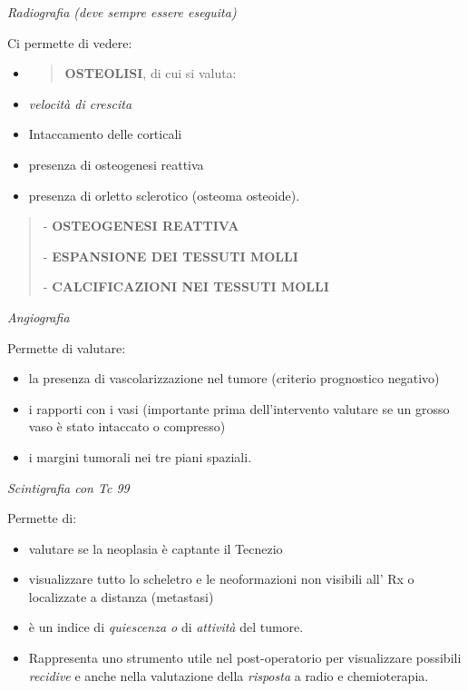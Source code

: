 \documentclass[]{article}
\begin{document}
\emph{Radiografia (deve sempre essere eseguita)}

Ci permette di vedere:

\begin{itemize}
\item
  \begin{quote}
  \textbf{OSTEOLISI}, di cui si valuta:
  \end{quote}
\end{itemize}

\begin{itemize}
\item
  \emph{velocità di crescita}
\item
  Intaccamento delle corticali
\item
  presenza di osteogenesi reattiva
\item
  presenza di orletto sclerotico (osteoma osteoide).
\end{itemize}

\begin{quote}
- \textbf{OSTEOGENESI REATTIVA}

- \textbf{ESPANSIONE DEI TESSUTI MOLLI}

- \textbf{CALCIFICAZIONI NEI TESSUTI MOLLI}
\end{quote}

\emph{Angiografia}

Permette di valutare:

\begin{itemize}
\item
  la presenza di vascolarizzazione nel tumore (criterio prognostico
  negativo)
\item
  i rapporti con i vasi (importante prima dell'intervento valutare se un
  grosso vaso è stato intaccato o compresso)
\item
  i margini tumorali nei tre piani spaziali.
\end{itemize}

\emph{Scintigrafia con Tc 99}

Permette di:

\begin{itemize}
\item
  valutare se la neoplasia è captante il Tecnezio
\item
  visualizzare tutto lo scheletro e le neoformazioni non visibili all'
  Rx o localizzate a distanza (metastasi)
\item
  è un indice di \emph{quiescenza o} di \emph{attività} del tumore.
\item
  Rappresenta uno strumento utile nel post-operatorio per visualizzare
  possibili \emph{recidive} e anche nella valutazione della
  \emph{risposta} a radio e chemioterapia.
\end{itemize}
\end{document}
